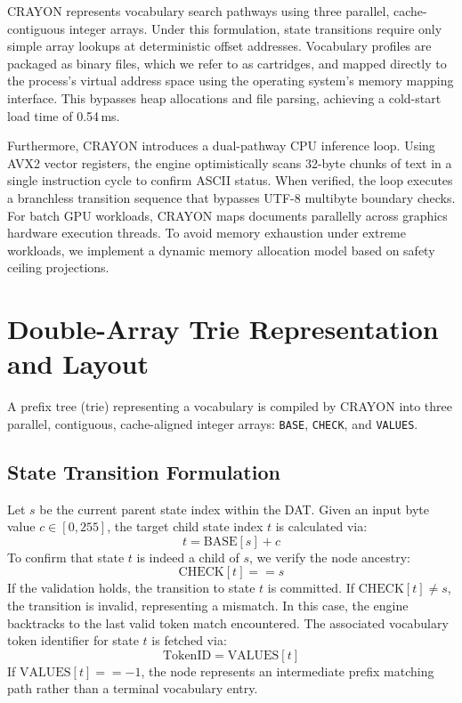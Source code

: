 \documentclass[10pt,journal,compsoc]{IEEEtran}
\begin{document}
CRAYON represents vocabulary search pathways using three parallel, cache-contiguous integer arrays. Under this formulation, state transitions require only simple array lookups at deterministic offset addresses. Vocabulary profiles are packaged as binary files, which we refer to as cartridges, and mapped directly to the process's virtual address space using the operating system's memory mapping interface. This bypasses heap allocations and file parsing, achieving a cold-start load time of 0.54\,ms.

Furthermore, CRAYON introduces a dual-pathway CPU inference loop. Using AVX2 vector registers, the engine optimistically scans 32-byte chunks of text in a single instruction cycle to confirm ASCII status. When verified, the loop executes a branchless transition sequence that bypasses UTF-8 multibyte boundary checks. For batch GPU workloads, CRAYON maps documents parallelly across graphics hardware execution threads. To avoid memory exhaustion under extreme workloads, we implement a dynamic memory allocation model based on safety ceiling projections.

\section{Double-Array Trie Representation and Layout}
A prefix tree (trie) representing a vocabulary is compiled by CRAYON into three parallel, contiguous, cache-aligned integer arrays: \texttt{BASE}, \texttt{CHECK}, and \texttt{VALUES}.

\subsection{State Transition Formulation}
Let $s$ be the current parent state index within the DAT. Given an input byte value $c \in [0, 255]$, the target child state index $t$ is calculated via:
\begin{equation}
t = \text{BASE}[s] + c
\end{equation}
To confirm that state $t$ is indeed a child of $s$, we verify the node ancestry:
\begin{equation}
\text{CHECK}[t] == s
\end{equation}
If the validation holds, the transition to state $t$ is committed. If $\text{CHECK}[t] \neq s$, the transition is invalid, representing a mismatch. In this case, the engine backtracks to the last valid token match encountered. The associated vocabulary token identifier for state $t$ is fetched via:
\begin{equation}
\text{TokenID} = \text{VALUES}[t]
\end{equation}
If $\text{VALUES}[t] == -1$, the node represents an intermediate prefix matching path rather than a terminal vocabulary entry.
\end{document}
